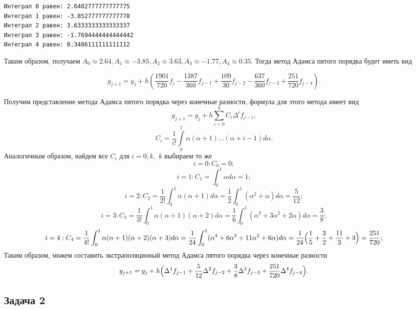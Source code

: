 \documentclass[11pt]{article}
\begin{document}
    \begin{Verbatim}[commandchars=\\\{\}]
Интеграл 0 равен: 2.6402777777777775
Интеграл 1 равен: -3.852777777777778
Интеграл 2 равен: 3.6333333333333337
Интеграл 3 равен: -1.7694444444444442
Интеграл 4 равен: 0.3486111111111112
    \end{Verbatim}

    Таким образом, получаем
\(A_0 \approx 2.64, A_1 \approx -3.85, A_2 \approx 3.63, A_3 \approx -1.77, A_4 \approx 0.35\).
Тогда метод Адамса пятого порядка будет иметь вид

\[y_{j+1} = y_j + h(\frac{1901}{720}f_j -\frac{1387}{360} f_{j-1} + \frac{109}{30} f_{j-2}-\frac{637}{360} f_{j-3} +\frac{251}{720} f_{j-4}).\]

Получим представление метода Адамса пятого порядка через конечные
разности, формула для этого метода имеет вид
\[y_{j+1} = y_j + h\sum_{i=0}^{k}C_i \Delta ^i f_{j-i},\]
\[C_i = \dfrac{1}{i!}\int\limits_0^1 \alpha(\alpha+1)\ldots(\alpha+i-1)d\alpha.\]
Аналогичным образом, найдем все \(C_i\) для \(i=\overline{0,k},\) \(k\)
выбираем то же \[i=0: C_0 = 0;\]
\[i=1: C_1 = \int_0^1\alpha d\alpha = 1;\]
\[i=2: C_2 = \frac{1}{2!}\int_0^1\alpha(\alpha+1)d\alpha = \frac{1}{2}\int_0^1(\alpha^2+\alpha) d\alpha = \frac{5}{12};\]
\[i=3: C_3 = \frac{1}{3!}\int_0^1\alpha(\alpha+1)(\alpha+2)d\alpha=\frac{1}{6}\int_0^1 (\alpha^3+3\alpha^2+2\alpha) d\alpha = \frac{3}{8};\]
\[i=4: C_4 = \frac{1}{4!}\int_0^1\alpha(\alpha+1)(\alpha+2)(\alpha+3) d\alpha = \frac{1}{24}\int_0^1(\alpha^4+6\alpha^3+11\alpha^2+6\alpha) d\alpha = \frac{1}{24}\Bigl(\frac{1}{5}+\frac{3}{2}+\frac{11}{3}+3\Bigr) = \frac{251}{720};\]
Таким образом, можем составить экстраполяционый метод Адамса пятого
порядка через конечные разности
\[y_{j+1}=y_j+h\Bigl( \Delta^1 f_{j-1} + \frac{5}{12} \Delta^2 f_{j-2} + \frac{3}{8} \Delta^3 f_{j-3} + \frac{251}{720} \Delta^4 f_{j-4}\Bigr).\]

    \subsection*{Задача 2}\label{ux437ux430ux434ux430ux447ux430-2}
\end{document}
